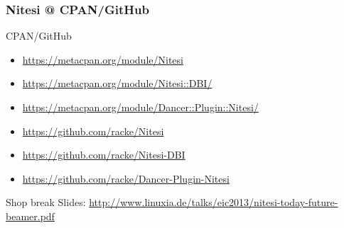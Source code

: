 \subsubsection{Nitesi @ CPAN/GitHub}
\begin{frame}{CPAN/GitHub}
\begin{itemize}
\item \url{https://metacpan.org/module/Nitesi}
\item \url{https://metacpan.org/module/Nitesi::DBI/}
\item \url{https://metacpan.org/module/Dancer::Plugin::Nitesi/}
\end{itemize}
\begin{itemize}
\item \url{https://github.com/racke/Nitesi}
\item \url{https://github.com/racke/Nitesi-DBI}
\item \url{https://github.com/racke/Dancer-Plugin-Nitesi}
\end{itemize}
\end{frame}

\begin{frame}{Shop break}
Slides:
\url{http://www.linuxia.de/talks/eic2013/nitesi-today-future-beamer.pdf}
\end{frame}



